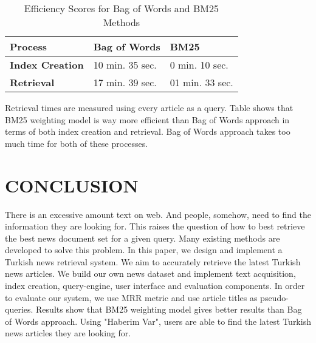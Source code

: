 \documentclass[conference]{IEEEtran}
\begin{document}
\begin{table}[htbp]
\caption{Efficiency Scores for Bag of Words and BM25 Methods}
\begin{center}
\begin{tabular}{|p{22mm}|p{20mm}|p{20mm}|}
\hline
\textbf{Process}& \textbf{Bag of Words}& \textbf{BM25} \\
\hline
\textbf{Index Creation} & 10 min. 35 sec. &  0 min. 10 sec. \\
\textbf{Retrieval} & 17 min. 39 sec. & 01 min. 33 sec. \\
\hline
\end{tabular}
\label{tab1}
\end{center}
\end{table}

Retrieval times are measured using every article as a query. Table shows that BM25 weighting model is way more efficient than Bag of Words approach in terms of both index creation and retrieval. Bag of Words approach takes too much time for both of these processes.

\section{CONCLUSION}
There is an excessive amount text on web. And people, somehow, need to find the information they are looking for. This raises the question of how to best retrieve the best news document set for a given query. Many existing methods are developed to solve this problem. In this paper, we design and implement a Turkish news retrieval system. We aim to accurately retrieve the latest Turkish news articles. We build our own news dataset and implement text acquisition, index creation, query-engine, user interface and evaluation components. In order to evaluate our system, we use MRR metric and use article titles as pseudo-queries. Results show that BM25 weighting model gives better results than Bag of Words approach. Using "Haberim Var", users are able to find the latest Turkish news articles they are looking for.





\end{document}
